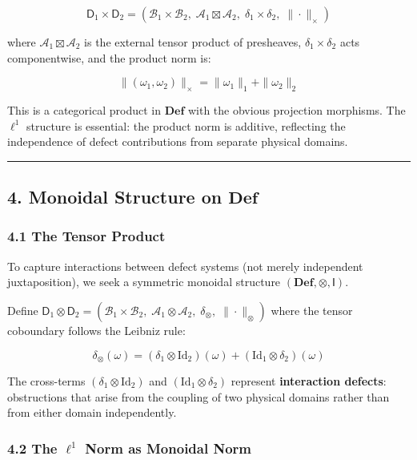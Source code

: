 \documentclass[
]{article}
\begin{document}
\[\mathsf{D}_1 \times \mathsf{D}_2 = (\mathcal{B}_1 \times \mathcal{B}_2, \; \mathcal{A}_1 \boxtimes \mathcal{A}_2, \; \delta_1 \times \delta_2, \; \|\cdot\|_\times)\]

where \(\mathcal{A}_1 \boxtimes \mathcal{A}_2\) is the external tensor
product of presheaves, \(\delta_1 \times \delta_2\) acts componentwise,
and the product norm is:

\[\|(\omega_1, \omega_2)\|_\times = \|\omega_1\|_1 + \|\omega_2\|_2\]

This is a categorical product in \(\mathbf{Def}\) with the obvious
projection morphisms. The \(\ell^1\) structure is essential: the product
norm is additive, reflecting the independence of defect contributions
from separate physical domains.

\begin{center}\rule{0.5\linewidth}{0.5pt}\end{center}

\subsection{\texorpdfstring{4. Monoidal Structure on
\(\mathbf{Def}\)}{4. Monoidal Structure on \textbackslash mathbf\{Def\}}}\label{monoidal-structure-on-mathbfdef}

\subsubsection{4.1 The Tensor Product}\label{the-tensor-product}

To capture interactions between defect systems (not merely independent
juxtaposition), we seek a symmetric monoidal structure
\((\mathbf{Def}, \otimes, \mathsf{I})\).

Define
\(\mathsf{D}_1 \otimes \mathsf{D}_2 = (\mathcal{B}_1 \times \mathcal{B}_2, \; \mathcal{A}_1 \otimes \mathcal{A}_2, \; \delta_\otimes, \; \|\cdot\|_\otimes)\)
where the tensor coboundary follows the Leibniz rule:

\[\delta_\otimes(\omega) = (\delta_1 \otimes \mathrm{Id}_2)(\omega) + (\mathrm{Id}_1 \otimes \delta_2)(\omega)\]

The cross-terms \((\delta_1 \otimes \mathrm{Id}_2)\) and
\((\mathrm{Id}_1 \otimes \delta_2)\) represent \textbf{interaction
defects}: obstructions that arise from the coupling of two physical
domains rather than from either domain independently.

\subsubsection{\texorpdfstring{4.2 The \(\ell^1\) Norm as Monoidal
Norm}{4.2 The \textbackslash ell\^{}1 Norm as Monoidal Norm}}\label{the-ell1-norm-as-monoidal-norm}
\end{document}
